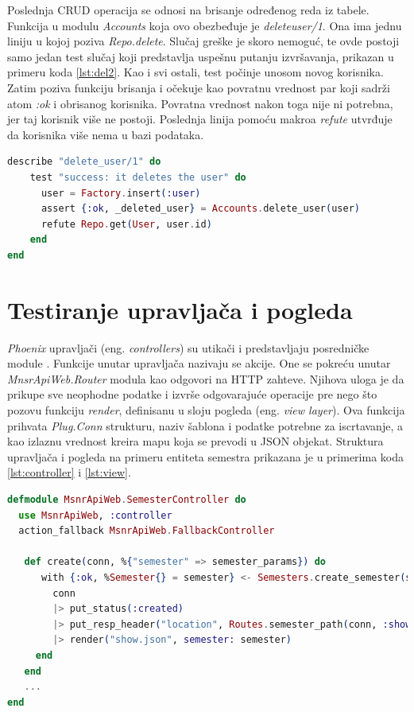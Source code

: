 \documentclass[12pt,oneside]{memoir}
\begin{document}
\par Poslednja CRUD operacija se odnosi na brisanje određenog reda iz tabele. Funkcija u modulu \emph{Accounts} koja ovo obezbeđuje je \emph{delete{\textunderscore}user/1}. Ona ima jednu liniju u kojoj poziva \emph{Repo.delete}. Slučaj greške je skoro nemoguć, te ovde postoji samo jedan test slučaj koji predstavlja uspešnu putanju izvršavanja, prikazan u primeru koda \ref{lst:del2}. Kao i svi ostali, test počinje unosom novog korisnika. Zatim poziva funkciju brisanja i očekuje kao povratnu vrednost par koji sadrži atom \emph{:ok} i obrisanog korisnika. Povratna vrednost nakon toga nije ni potrebna, jer taj korisnik više ne postoji. Poslednja linija pomoću makroa \emph{refute} utvrđuje da korisnika više nema u bazi podataka. 

\begin{lstlisting}[language=elixir, caption={Testiranje funkcije \emph{delete{\textunderscore}user/1}},captionpos=b, label={lst:del2}]
describe "delete_user/1" do
    test "success: it deletes the user" do
      user = Factory.insert(:user)
      assert {:ok, _deleted_user} = Accounts.delete_user(user)
      refute Repo.get(User, user.id)
    end
end
\end{lstlisting}

\section{Testiranje upravljača i pogleda}

\par \emph{Phoenix} upravljači (eng. \emph{controllers}) su utikači i predstavljaju posredničke module \cite{hexcontrol}. Funkcije unutar upravljača nazivaju se akcije. One se pokreću unutar \emph{MnsrApiWeb.Router} modula kao odgovori na HTTP zahteve. Njihova uloga je da prikupe sve neophodne podatke i izvrše odgovarajuće operacije pre nego što 
pozovu funkciju \emph{render}, definisanu u sloju pogleda (eng. \emph{view layer}). Ova funkcija prihvata \emph{Plug.Conn} strukturu, naziv šablona i podatke potrebne za iscrtavanje, a kao izlaznu vrednost kreira mapu koja se prevodi u JSON objekat. Struktura upravljača i pogleda na primeru entiteta semestra prikazana je u primerima koda \ref{lst:controller} i \ref{lst:view}.

\begin{lstlisting}[language=elixir, caption={Struktura upravljača \emph{SemesterController}},captionpos=b, label={lst:controller}]
defmodule MsnrApiWeb.SemesterController do
  use MsnrApiWeb, :controller
  action_fallback MsnrApiWeb.FallbackController

   def create(conn, %{"semester" => semester_params}) do
      with {:ok, %Semester{} = semester} <- Semesters.create_semester(semester_params) do
        conn
        |> put_status(:created)
        |> put_resp_header("location", Routes.semester_path(conn, :show, semester))
        |> render("show.json", semester: semester)
     end
   end
   ...
end
\end{lstlisting}
\end{document}

